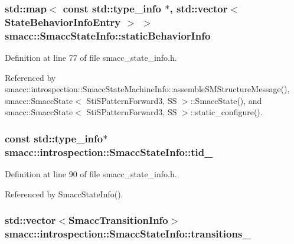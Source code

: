 \subsubsection[{\texorpdfstring{static\+Behavior\+Info}{staticBehaviorInfo}}]{\setlength{\rightskip}{0pt plus 5cm}std\+::map$<$ const std\+::type\+\_\+info $\ast$, std\+::vector$<$ {\bf State\+Behavior\+Info\+Entry} $>$ $>$ smacc\+::\+Smacc\+State\+Info\+::static\+Behavior\+Info\hspace{0.3cm}{\ttfamily [static]}}\hypertarget{classsmacc_1_1introspection_1_1SmaccStateInfo_a2cc62c6c9dec1a4f5294f8430efb71f2}{}\label{classsmacc_1_1introspection_1_1SmaccStateInfo_a2cc62c6c9dec1a4f5294f8430efb71f2}


Definition at line 77 of file smacc\+\_\+state\+\_\+info.\+h.



Referenced by smacc\+::introspection\+::\+Smacc\+State\+Machine\+Info\+::assemble\+S\+M\+Structure\+Message(), smacc\+::\+Smacc\+State$<$ Sti\+S\+Pattern\+Forward3, S\+S $>$\+::\+Smacc\+State(), and smacc\+::\+Smacc\+State$<$ Sti\+S\+Pattern\+Forward3, S\+S $>$\+::static\+\_\+configure().

\subsubsection[{\texorpdfstring{tid\+\_\+}{tid_}}]{\setlength{\rightskip}{0pt plus 5cm}const std\+::type\+\_\+info$\ast$ smacc\+::introspection\+::\+Smacc\+State\+Info\+::tid\+\_\+}\hypertarget{classsmacc_1_1introspection_1_1SmaccStateInfo_a37d0d0bce171b57b8d3a39f44ab45248}{}\label{classsmacc_1_1introspection_1_1SmaccStateInfo_a37d0d0bce171b57b8d3a39f44ab45248}


Definition at line 90 of file smacc\+\_\+state\+\_\+info.\+h.



Referenced by Smacc\+State\+Info().

\subsubsection[{\texorpdfstring{transitions\+\_\+}{transitions_}}]{\setlength{\rightskip}{0pt plus 5cm}std\+::vector$<${\bf Smacc\+Transition\+Info}$>$ smacc\+::introspection\+::\+Smacc\+State\+Info\+::transitions\+\_\+}\hypertarget{classsmacc_1_1introspection_1_1SmaccStateInfo_ae8b5d8e409e377ef9a88d92fb31a8446}{}\label{classsmacc_1_1introspection_1_1SmaccStateInfo_ae8b5d8e409e377ef9a88d92fb31a8446}


